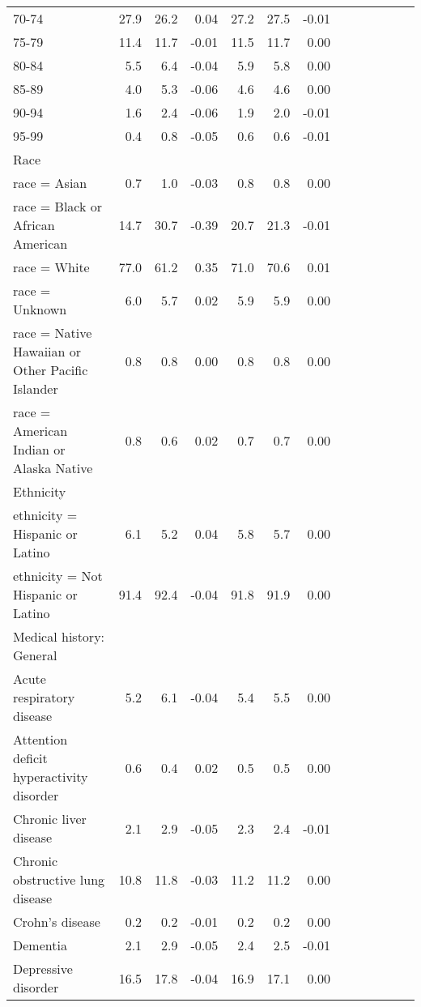 \documentclass[11pt,]{article}
\begin{document}
\begin{longtable}{lrrrrrrrrrrrr}
      70-74 & 27.9 & 26.2 &  0.04 & 27.2 & 27.5 & -0.01 \\ 
      75-79 & 11.4 & 11.7 & -0.01 & 11.5 & 11.7 &  0.00 \\ 
      80-84 &  5.5 &  6.4 & -0.04 &  5.9 &  5.8 &  0.00 \\ 
      85-89 &  4.0 &  5.3 & -0.06 &  4.6 &  4.6 &  0.00 \\ 
      90-94 &  1.6 &  2.4 & -0.06 &  1.9 &  2.0 & -0.01 \\ 
      95-99 &  0.4 &  0.8 & -0.05 &  0.6 &  0.6 & -0.01 \\ 
  Race &    &    &     &    &    &     \\ 
      race = Asian &  0.7 &  1.0 & -0.03 &  0.8 &  0.8 &  0.00 \\ 
      race = Black or African American & 14.7 & 30.7 & -0.39 & 20.7 & 21.3 & -0.01 \\ 
      race = White & 77.0 & 61.2 &  0.35 & 71.0 & 70.6 &  0.01 \\ 
      race = Unknown &  6.0 &  5.7 &  0.02 &  5.9 &  5.9 &  0.00 \\ 
      race = Native Hawaiian or Other Pacific Islander &  0.8 &  0.8 &  0.00 &  0.8 &  0.8 &  0.00 \\ 
      race = American Indian or Alaska Native &  0.8 &  0.6 &  0.02 &  0.7 &  0.7 &  0.00 \\ 
  Ethnicity &    &    &     &    &    &     \\ 
      ethnicity = Hispanic or Latino &  6.1 &  5.2 &  0.04 &  5.8 &  5.7 &  0.00 \\ 
      ethnicity = Not Hispanic or Latino & 91.4 & 92.4 & -0.04 & 91.8 & 91.9 &  0.00 \\ 
  Medical history: General &    &    &     &    &    &     \\ 
      Acute respiratory disease &  5.2 &  6.1 & -0.04 &  5.4 &  5.5 &  0.00 \\ 
      Attention deficit hyperactivity disorder &  0.6 &  0.4 &  0.02 &  0.5 &  0.5 &  0.00 \\ 
      Chronic liver disease &  2.1 &  2.9 & -0.05 &  2.3 &  2.4 & -0.01 \\ 
      Chronic obstructive lung disease & 10.8 & 11.8 & -0.03 & 11.2 & 11.2 &  0.00 \\ 
      Crohn's disease &  0.2 &  0.2 & -0.01 &  0.2 &  0.2 &  0.00 \\ 
      Dementia &  2.1 &  2.9 & -0.05 &  2.4 &  2.5 & -0.01 \\ 
      Depressive disorder & 16.5 & 17.8 & -0.04 & 16.9 & 17.1 &  0.00 \\ 

\end{longtable}
\end{document}
